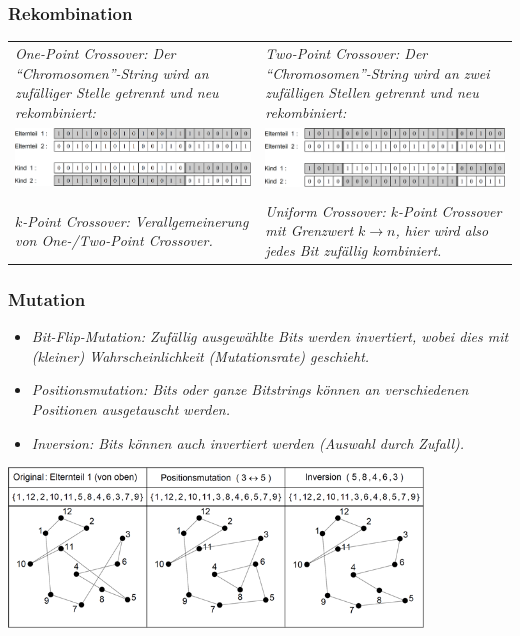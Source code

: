 \subsubsection{Rekombination }
  \begin{tabularx}{\textwidth}{p{9cm} p{9cm}}
    \em One-Point Crossover\em : Der "`Chromosomen"'-String wird an zufälliger Stelle getrennt und neu rekombiniert: 
      & \em Two-Point Crossover\em : Der "`Chromosomen"'-String wird an zwei zufälligen Stellen getrennt und neu rekombiniert: \\
    \includegraphics[width=8cm]{./Content/MetaHeuristics/GeneticAlgorithms_OnePointCrossover}
      & \includegraphics[width=8cm]{./Content/MetaHeuristics/GeneticAlgorithms_TwoPointCrossover} \\ \\
    \em $k$-Point Crossover\em : Verallgemeinerung von One-/Two-Point Crossover.
      & \em Uniform Crossover\em : $k$-Point Crossover mit Grenzwert $k \rightarrow n$, hier wird also jedes Bit zufällig kombiniert.
  \end{tabularx}
   
  
\subsubsection{Mutation }
  \begin{minipage}{8cm}
    \begin{itemize}
      \item \em Bit-Flip-Mutation\em : Zufällig ausgewählte Bits werden invertiert, wobei dies mit (kleiner) Wahrscheinlichkeit (Mutationsrate) geschieht.
      \item \em Positionsmutation\em : Bits oder ganze Bitstrings können an verschiedenen Positionen ausgetauscht werden.
      \item \em Inversion\em : Bits können auch invertiert werden (Auswahl durch Zufall). 
    \end{itemize}
  \end{minipage}
  \begin{minipage}{11cm}
    \includegraphics[width=11cm]{./Content/MetaHeuristics/GeneticAlgorithms_Mutation}
  \end{minipage}
  
